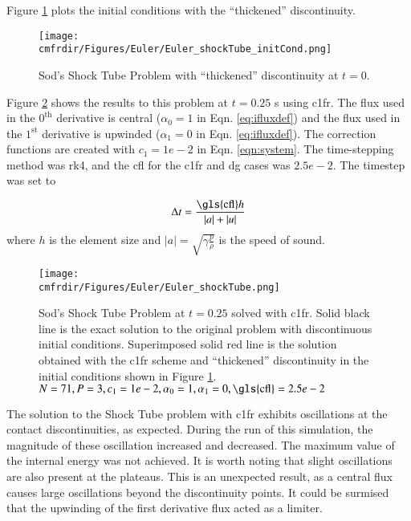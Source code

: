 Figure \ref{c1fr_shockTube_initCond} plots the initial conditions with the ``thickened'' discontinuity.

\begin{figure}
\centering
\hspace{-1.25 cm}
\centering\texttt{[image: \\cmfrdir/Figures/Euler/Euler\_shockTube\_initCond.png]}
  \caption{Sod's Shock Tube Problem with ``thickened'' discontinuity at $t = 0$.}
  \label{c1fr_shockTube_initCond}
\end{figure}

Figure \ref{c1fr_shockTube} shows the results to this problem at $t=0.25$ s using \gls{c1fr}. The flux used in the $0^{\mathrm{th}}$ derivative is central ($\alpha_0 = 1$ in Eqn. \eqref{eq:ifluxdef}) and the flux used in the $1^{\mathrm{st}}$ derivative is upwinded ($\alpha_1 = 0$ in Eqn. \eqref{eq:ifluxdef}). The correction functions are created with $c_1 = 1e-2$ in Eqn. \eqref{eqn:system}. The time-stepping method was \gls{rk}4, and the \gls{cfl} for the \gls{c1fr} and \gls{dg} cases was $2.5e-2$. The timestep was set to

\begin{equation}
\label{eq:cfl_cond}
\Delta t = \frac{\mathrm{\gls{cfl}} h}{|a|+|u|}
\end{equation}
where $h$ is the element size and $|a| = \sqrt{\gamma  \frac{p}{\rho}}$ is the speed of sound.

\begin{figure}
\centering
\hspace{-1.25 cm}
\centering\texttt{[image: \\cmfrdir/Figures/Euler/Euler\_shockTube.png]}
  \caption{Sod's Shock Tube Problem at $t = 0.25$ solved with \gls{c1fr}. Solid black line is the exact solution to the original problem with discontinuous initial conditions. Superimposed solid red line is the solution obtained with the \gls{c1fr} scheme and ``thickened'' discontinuity in the initial conditions shown in Figure \ref{c1fr_shockTube_initCond}. $N=71, P=3,  c_1 = 1e-2, \alpha_0=1, \alpha_1 = 0, \mathrm{\gls{cfl}}=2.5e-2$}
  \label{c1fr_shockTube}
\end{figure}

The solution to the Shock Tube problem with \gls{c1fr} exhibits oscillations at the contact discontinuities, as expected. During the run of this simulation, the magnitude of these oscillation increased and decreased. The maximum value of the internal energy was not achieved. It is worth noting that slight oscillations are also present at the plateaus. This is an unexpected result, as a central flux causes large oscillations beyond the discontinuity points. It could be surmised that the upwinding of the first derivative flux acted as a limiter.

